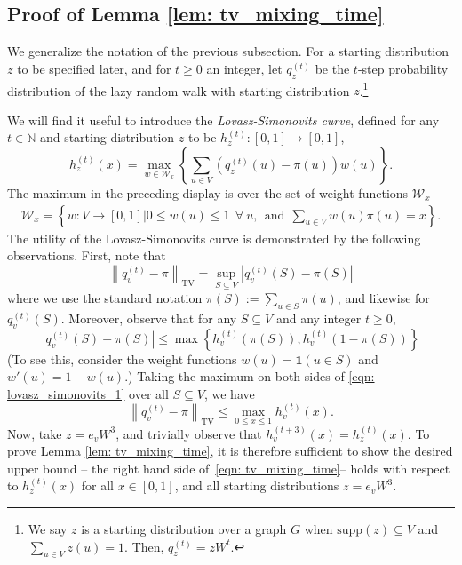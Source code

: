 \documentclass[11pt,twoside]{article}
\newcommand{\set}[1]{\left\{#1\right\}}
\newcommand{\abs}[1]{\left \lvert #1 \right \rvert}
\newcommand{\norm}[1]{\left\lVert#1\right\rVert}
\newcommand{\1}{\mathbf{1}}
\begin{document}
\subsection{Proof of Lemma \ref{lem: tv_mixing_time}}
\label{sec: mixing_time_on_graphs}

We generalize the notation of the previous subsection. For a starting distribution $z$ to be specified later, and for $t \geq 0$ an integer, let $q_z^{(t)}$ be the $t$-step probability distribution of the lazy random walk with starting distribution $z$.\footnote{We say $z$ is a starting distribution over a graph $G$ when $\textrm{supp}(z) \subseteq V$ and $\sum_{u \in V}z(u) = 1$. Then, $q_z^{(t)} = zW^t$.}

We will find it useful to introduce the \emph{Lovasz-Simonovits curve}, defined for any $t \in \mathbb{N}$ and starting distribution $z$ to be $h_z^{(t)}: [0,1] \to [0,1]$,
\begin{equation*}
h_z^{(t)}(x) = \max_{w \in \mathcal{W}_x} \left\{ \sum_{u \in V} \left(q_z^{(t)}(u) - \pi(u)\right)w(u)\right\}.
\end{equation*}
The maximum in the preceding display is over the set of weight functions $\mathcal{W}_{x}$
\begin{align*}
\mathcal{W}_x = \left\{w: V \to [0,1] \Big\vert 0 \leq w(u) \leq 1~~\forall~u,~~\text{and}~~\sum_{u \in V} w(u) \pi(u) = x\right\}.
\end{align*}
The utility of the Lovasz-Simonovits curve is demonstrated by the following observations. First, note that
\begin{equation*}
\norm{q_v^{(t)} - \pi}_{\mathrm{TV}} = \sup_{S \subseteq V} \abs{q_v^{(t)}(S) - \pi(S)}
\end{equation*}
where we use the standard notation $\pi(S) := \sum_{u \in S} \pi(u)$, and likewise for $q_v^{(t)}(S)$. Moreover, observe that for any $S \subseteq V$ and any integer $t \geq 0$,
\begin{equation}
\label{eqn: lovasz_simonovits_1}
\abs{q_v^{(t)}(S) - \pi(S)} \leq \max \set{h_v^{(t)}(\pi(S)), h_v^{(t)}(1 - \pi(S))}
\end{equation}
(To see this, consider the weight functions $w(u) = \1(u \in S)$ and $w'(u) = 1 - w(u)$.) Taking the maximum on both sides of \eqref{eqn: lovasz_simonovits_1}  over all $S \subseteq V$, we have
\begin{equation*}
\norm{q_v^{(t)} - \pi}_{\mathrm{TV}} \leq \max_{0 \leq x \leq 1} h_v^{(t)}(x).
\end{equation*}
Now, take $z = e_vW^3$, and trivially observe that $h_v^{(t+3)}(x) = h_z^{(t)}(x)$. To prove Lemma \ref{lem: tv_mixing_time}, it is therefore sufficient to show the desired upper bound -- the right hand side of~\eqref{eqn: tv_mixing_time}-- holds with respect to $h_z^{(t)}(x)$ for all $x \in [0,1]$, and all starting distributions $z = e_vW^3$. 
\end{document}
